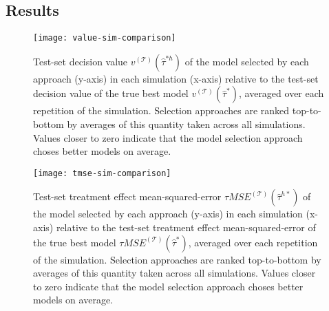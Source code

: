 \begin{comment}
We also calculate these using the true model $\hat\tau = \tau$, which represents the best achievable performance without specifying any models a-priori:

\[
\tau MSE^{(\mathcal{T})}_{**} = 0
\]

\[
v^{(\mathcal{T})}_{**} = \frac{1}{|\mathcal{T}|}\sum_{i \in \mathcal{T}} \mu_{ d(x_i)}(x_i)
\]

We use these minima to calculate the improvements obtained by each model selection approach relative to optimal baselines, which allows for comparison between different simulations. The relative values of $\tau MSE^{(\mathcal{T})}_{h}$ and $C^{(\mathcal{T})}_{h}$ within one test set and one set of models are

\[
	R\text{-} \tau MSE^{(\mathcal{T})}_{h} = 
	\frac{\tau MSE^{(\mathcal{T})}_{h} - \tau MSE^{(\mathcal{T})}_{**}}{\tau MSE^{(\mathcal{T})}_{*} - \tau MSE^{(\mathcal{T})}_{**}}
\]

\[
	R\text{-}  v^{(\mathcal{T})}_{h} = 
	\frac{ v^{(\mathcal{T})}_{h} -  v^{(\mathcal{T})}_{**}}{ v^{(\mathcal{T})}_{*} -  v^{(\mathcal{T})}_{**}}
\]

The closer to zero these are, the better the performance of the model selection method.
\end{comment}

\subsection{Results}

\begin{figure}
\centering
\texttt{[image: value-sim-comparison]}
\caption{Test-set decision value $v^{(\mathcal T)}(\hat\tau^{*h})$ of the model selected by each approach (y-axis) in each simulation (x-axis) relative to the test-set decision value of the true best model $v^{(\mathcal T)}(\hat\tau^{*})$, averaged over each repetition of the simulation. Selection approaches are ranked top-to-bottom by averages of this quantity taken across all simulations. Values closer to zero indicate that the model selection approach choses better models on average.}
\end{figure}

\begin{figure}
\centering
\texttt{[image: tmse-sim-comparison]}
\caption{Test-set treatment effect mean-squared-error $\tau MSE^{(\mathcal{T})}(\hat\tau^{h*})$ of the model selected by each approach (y-axis) in each simulation (x-axis) relative to the test-set  treatment effect mean-squared-error of the true best model $\tau MSE^{(\mathcal{T})}(\hat\tau^{*})$, averaged over each repetition of the simulation. Selection approaches are ranked top-to-bottom by averages of this quantity taken across all simulations. Values closer to zero indicate that the model selection approach choses better models on average.}
\end{figure}

